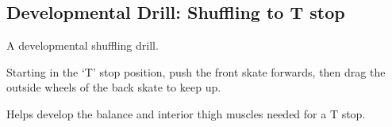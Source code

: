 \subsection*{Developmental Drill: Shuffling to T stop}
\label{sec:stopping/t_stops/developmental_shuffle}

A developmental shuffling drill.

Starting in the `T' stop position, push the front skate forwards, then drag the outside wheels of the back skate to keep up.

Helps develop the balance and interior thigh muscles needed for a T stop. 

